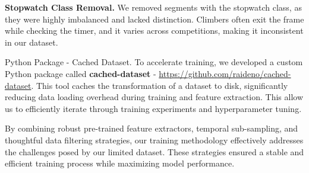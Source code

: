 \noindent\textbf{Stopwatch Class Removal.} We removed segments with the stopwatch class, as they were highly imbalanced and lacked distinction. Climbers often exit the frame while checking the timer, and it varies across competitions, making it inconsistent in our dataset.

\begin{AIbox}{Python Package - Cached Dataset.}
    To accelerate training, we developed a custom Python package called \textbf{cached-dataset} - \href{https://github.com/raideno/cached-dataset}{https://github.com/raideno/cached-dataset}. This tool caches the transformation of a dataset to disk, significantly reducing data loading overhead during training and feature extraction. This allow us to efficiently iterate through training experiments and hyperparameter tuning.
\end{AIbox}

By combining robust pre-trained feature extractors, temporal sub-sampling, and thoughtful data filtering strategies, our training methodology effectively addresses the challenges posed by our limited dataset. These strategies ensured a stable and efficient training process while maximizing model performance.